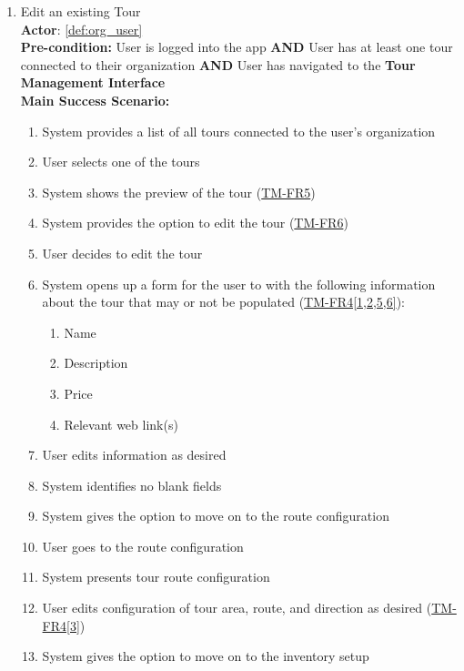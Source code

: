 \documentclass{article}
\begin{document}
\begin{enumerate}[label=\textbf{UC\arabic*}]
    \item \label{uc:3} Edit an existing Tour \\
        \textbf{Actor}: \ref{def:org_user} \\
        \textbf{Pre-condition:} User is logged into the app \textbf{AND} User has at least one tour connected to their organization \textbf{AND} User has navigated to the \textbf{Tour Management Interface} \\
    
        \textbf{Main Success Scenario:}
        \begin{enumerate}[label=\textbf{\arabic*.}]
            \item System provides a list of all tours connected to the user’s organization
            \item User selects one of the tours
            \item System shows the preview of the tour (\hyperref[ssub:tour_management]{TM-FR5})
            \item System provides the option to edit the tour (\hyperref[ssub:tour_management]{TM-FR6})
            \item User decides to edit the tour
            \item System opens up a form for the user to with the following information about the tour that may or not be populated (\hyperref[ssub:tour_management]{TM-FR4[1,2,5,6]}):
            \begin{enumerate}
                \item Name
                \item Description
                \item Price
                \item Relevant web link(s)
            \end{enumerate}
            \item User edits information as desired
            \item System identifies no blank fields
            \item System gives the option to move on to the route configuration
            \item User goes to the route configuration
            \item System presents tour route configuration
            \item User edits configuration of tour area, route, and direction as desired (\hyperref[ssub:tour_management]{TM-FR4[3]})
            \item System gives the option to move on to the inventory setup

\end{enumerate}
\end{enumerate}
\end{document}

